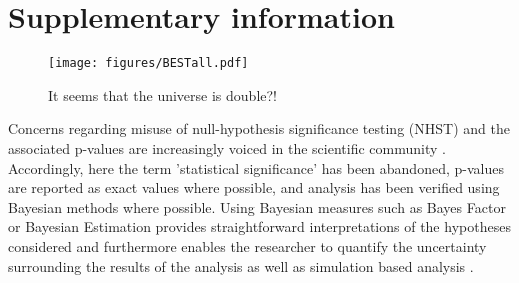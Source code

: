 \chapter{Supplementary information}
\label{chap:supp}

\begin{figure}
    \centering
        \texttt{[image: figures/BESTall.pdf]}
   \caption{It seems that the universe is double?!}
    \label{Supp. Fig:2}
\end{figure}


Concerns regarding misuse of null-hypothesis significance testing (NHST) and the associated p-values are increasingly voiced in the scientific community \autocite{Amrhein2019}. Accordingly, here the term 'statistical significance' has been abandoned, p-values are reported as exact values where possible, and analysis has been verified using Bayesian methods where possible. Using Bayesian measures such as Bayes Factor or Bayesian Estimation provides straightforward interpretations of the hypotheses considered and furthermore enables the researcher to quantify the uncertainty surrounding the results of the analysis as well as simulation based analysis \autocites{Clyde2019AnCourse, Kruschke2013}.